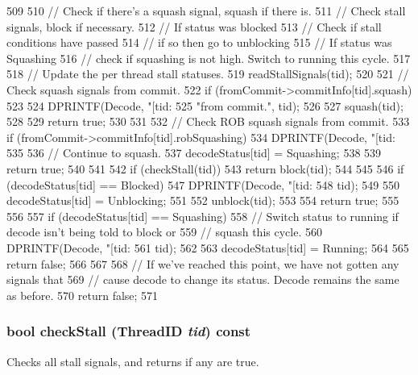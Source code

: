 \begin{DoxyCode}
509 {
510     // Check if there's a squash signal, squash if there is.
511     // Check stall signals, block if necessary.
512     // If status was blocked
513     //     Check if stall conditions have passed
514     //         if so then go to unblocking
515     // If status was Squashing
516     //     check if squashing is not high.  Switch to running this cycle.
517 
518     // Update the per thread stall statuses.
519     readStallSignals(tid);
520 
521     // Check squash signals from commit.
522     if (fromCommit->commitInfo[tid].squash) {
523 
524         DPRINTF(Decode, "[tid:%
525                 "from commit.\n", tid);
526 
527         squash(tid);
528 
529         return true;
530     }
531 
532     // Check ROB squash signals from commit.
533     if (fromCommit->commitInfo[tid].robSquashing) {
534         DPRINTF(Decode, "[tid:%
535 
536         // Continue to squash.
537         decodeStatus[tid] = Squashing;
538 
539         return true;
540     }
541 
542     if (checkStall(tid)) {
543         return block(tid);
544     }
545 
546     if (decodeStatus[tid] == Blocked) {
547         DPRINTF(Decode, "[tid:%
548                 tid);
549 
550         decodeStatus[tid] = Unblocking;
551 
552         unblock(tid);
553 
554         return true;
555     }
556 
557     if (decodeStatus[tid] == Squashing) {
558         // Switch status to running if decode isn't being told to block or
559         // squash this cycle.
560         DPRINTF(Decode, "[tid:%
561                 tid);
562 
563         decodeStatus[tid] = Running;
564 
565         return false;
566     }
567 
568     // If we've reached this point, we have not gotten any signals that
569     // cause decode to change its status.  Decode remains the same as before.
570     return false;
571 }
\end{DoxyCode}
\hypertarget{classDefaultDecode_a6ba4f2f95d991f5be818dabf7500feed}{
\subsubsection[{checkStall}]{\setlength{\rightskip}{0pt plus 5cm}bool checkStall ({\bf ThreadID} {\em tid}) const}}
\label{classDefaultDecode_a6ba4f2f95d991f5be818dabf7500feed}
Checks all stall signals, and returns if any are true. 


